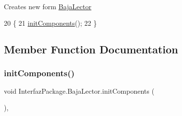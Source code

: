 Creates new form \mbox{\hyperlink{class_interfaz_package_1_1_baja_lector}{Baja\+Lector}} 
\begin{DoxyCode}
20                         \{
21         \mbox{\hyperlink{class_interfaz_package_1_1_baja_lector_a667facb9f42b9567bb69750de89e74ea}{initComponents}}();
22     \}
\end{DoxyCode}


\subsection{Member Function Documentation}
\mbox{\label{class_interfaz_package_1_1_baja_lector_a667facb9f42b9567bb69750de89e74ea}} 
\subsubsection{\texorpdfstring{init\+Components()}{initComponents()}}
{\footnotesize\ttfamily void Interfaz\+Package.\+Baja\+Lector.\+init\+Components (\begin{DoxyParamCaption}{ }\end{DoxyParamCaption})\hspace{0.3cm}{\ttfamily [inline]}, {\ttfamily [private]}}

